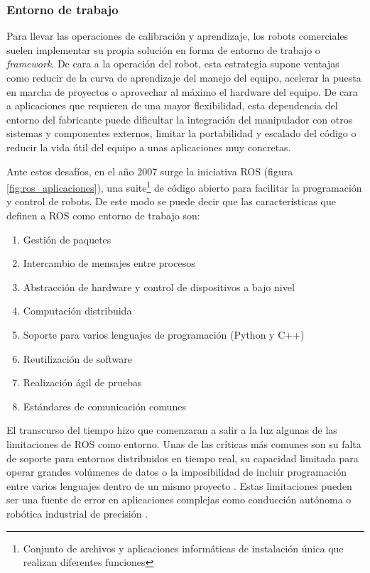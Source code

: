 \subsubsection*{Entorno de trabajo}
\hypertarget{Entorno de trabajo}{}

Para llevar las operaciones de calibración y aprendizaje, los robots comerciales suelen implementar su propia solución en forma de entorno de trabajo o \textit{framework}. De cara a la operación del robot, esta estrategia supone ventajas como reducir de la curva de aprendizaje del manejo del equipo, acelerar la puesta en marcha de proyectos o aprovechar al máximo el hardware del equipo. De cara a aplicaciones que requieren de una mayor flexibilidad, esta dependencia del entorno del fabricante puede dificultar la integración del manipulador con otros sistemas y componentes externos, limitar la portabilidad y escalado del código o reducir la vida útil del equipo a unas aplicaciones muy concretas.

Ante estos desafíos, en el año 2007 surge la iniciativa \acrshort{ROS} \cite{ROS_web}\cite{ROS_wiki} (figura \ref{fig:ros_aplicaciones}), una suite\footnote{Conjunto de archivos y aplicaciones informáticas de instalación única que realizan diferentes funciones} de código abierto para facilitar la programación y control de robots. De este modo se puede decir que las características \cite{Saavera_2023} que definen a \acrshort{ROS} como entorno de trabajo son:

\begin{enumerate}
    \item Gestión de paquetes
    \item Intercambio de mensajes entre procesos
    \item Abstracción de hardware y control de dispositivos a bajo nivel
    \item Computación distribuida
    \item Soporte para varios lenguajes de programación (Python y C++)
    \item Reutilización de software 
    \item Realización ágil de pruebas
    \item Estándares de comunicación comunes
\end{enumerate}
    
El transcurso del tiempo hizo que comenzaran a salir a la luz algunas de las limitaciones de \acrshort{ROS} como entorno. Unas de las críticas más comunes son su falta de soporte para entornos distribuidos en tiempo real, su capacidad limitada para operar grandes volúmenes de datos o la imposibilidad de incluir programación entre varios lenguajes dentro de un mismo proyecto \cite{desventajas_ROS_webpage}\cite{ROS_vs_ROS2_webpage}. Estas limitaciones pueden ser una fuente de error en aplicaciones complejas como conducción autónoma \cite{Perez-Gil_2021}\cite{hachem_2023} o robótica industrial de precisión \cite{Nabissi_2023}. 

